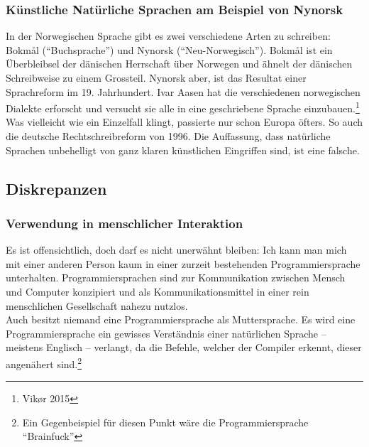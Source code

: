 \documentclass[10pt,a4paper]{article}
\begin{document}
\subsubsection{Künstliche Natürliche Sprachen am Beispiel von Nynorsk}
In der Norwegischen Sprache gibt es zwei verschiedene Arten zu schreiben: Bokmål (\enquote{Buchsprache}) und Nynorsk (\enquote{Neu-Norwegisch}). Bokmål ist ein Überbleibsel der dänischen Herrschaft über Norwegen und ähnelt der dänischen Schreibweise zu einem Grossteil. Nynorsk aber, ist das Resultat einer Sprachreform im 19. Jahrhundert. Ivar Aasen hat die verschiedenen norwegischen Dialekte erforscht und versucht sie alle in eine geschriebene Sprache einzubauen.\footnote{Vikør 2015} \\
Was vielleicht wie ein Einzelfall klingt, passierte nur schon Europa öfters. So auch die deutsche Rechtschreibreform von 1996. Die Auffassung, dass natürliche Sprachen unbehelligt von ganz klaren künstlichen Eingriffen sind, ist eine falsche.


\subsection{Diskrepanzen}
\subsubsection{Verwendung in menschlicher Interaktion}
Es ist offensichtlich, doch darf es nicht unerwähnt bleiben: Ich kann man mich mit einer anderen Person kaum in einer zurzeit bestehenden Programmiersprache unterhalten. Programmiersprachen sind zur Kommunikation zwischen Mensch und Computer konzipiert und als Kommunikationsmittel in einer rein menschlichen Gesellschaft nahezu nutzlos. \\
Auch besitzt niemand eine Programmiersprache als Muttersprache. Es wird eine Programmiersprache ein gewisses Verständnis einer natürlichen Sprache -- meistens Englisch --  verlangt, da die Befehle, welcher der Compiler erkennt, dieser angenähert sind.\footnote{Ein Gegenbeispiel für diesen Punkt wäre die Programmiersprache \enquote{Brainfuck}} \\
\end{document}
